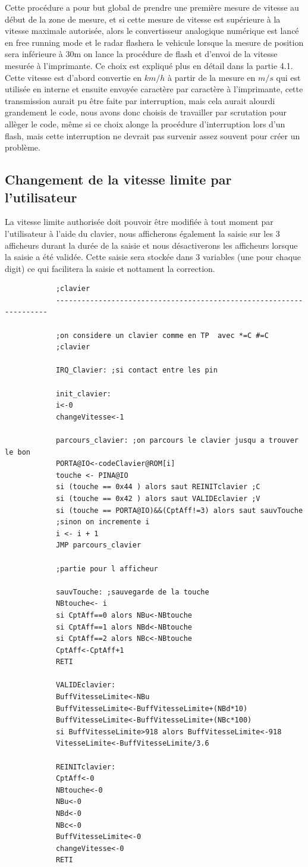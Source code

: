 \documentclass[a4paper, 12pt]{article}
\begin{document}
		Cette procédure a pour but global de prendre une première mesure de vitesse au début de la zone de mesure, et si cette mesure de vitesse est supérieure à la vitesse maximale autorisée, alors le convertisseur analogique numérique est lancé en free running mode et le radar flashera le vehicule lorsque la mesure de position sera inférieure à 30m on lance la procédure de flash et d'envoi de la vitesse mesurée à l'imprimante. Ce choix est expliqué plus en détail dans la partie 4.1.\\
		Cette vitesse est d'abord convertie en $km/h$ à partir de la mesure en $m/s$ qui est utilisée en interne et ensuite envoyée caractère par caractère à l'imprimante, cette transmission aurait pu être faite par interruption, mais cela aurait alourdi grandement le code, nous avons donc choisis de travailler par scrutation pour allèger le code, même si ce choix alonge la procédure d'interruption lors d'un flash, mais cette interruption ne devrait pas survenir assez souvent pour créer un problème.
		
		\subsection{Changement de la vitesse limite par l'utilisateur}
		La vitesse limite authorisée doit pouvoir être modifiée à tout moment par l'utilisateur à l'aide du clavier, nous afficherons également la saisie sur les 3 afficheurs durant la durée de la saisie et nous désactiverons les afficheurs lorsque la saisie a été validée. Cette saisie sera stockée dans 3 variables (une pour chaque digit) ce qui facilitera la saisie et nottament la correction.
		\begin{lstlisting}
			;clavier
			--------------------------------------------------------------------
			
			;on considere un clavier comme en TP  avec *=C #=C
			;clavier
			
			IRQ_Clavier: ;si contact entre les pin
			
			init_clavier:
			i<-0
			changeVitesse<-1
			
			parcours_clavier: ;on parcours le clavier jusqu a trouver le bon 
			PORTA@IO<-codeClavier@ROM[i]
			touche <- PINA@IO
			si (touche == 0x44 ) alors saut REINITclavier ;C
			si (touche == 0x42 ) alors saut VALIDEclavier ;V
			si (touche == PORTA@IO)&&(CptAff!=3) alors saut sauvTouche
			;sinon on incremente i
			i <- i + 1 
			JMP parcours_clavier
			
			;partie pour l afficheur 
			
			sauvTouche: ;sauvegarde de la touche 
			NBtouche<- i
			si CptAff==0 alors NBu<-NBtouche
			si CptAff==1 alors NBd<-NBtouche
			si CptAff==2 alors NBc<-NBtouche
			CptAff<-CptAff+1
			RETI
			
			VALIDEclavier:
			BuffVitesseLimite<-NBu
			BuffVitesseLimite<-BuffVitesseLimite+(NBd*10)
			BuffVitesseLimite<-BuffVitesseLimite+(NBc*100)
			si BuffVitesseLimite>918 alors BuffVitesseLimite<-918
			VitesseLimite<-BuffVitesseLimite/3.6
			
			REINITclavier:
			CptAff<-0
			NBtouche<-0 
			NBu<-0
			NBd<-0
			NBc<-0
			BuffVitesseLimite<-0
			changeVitesse<-0
			RETI
		\end{lstlisting}
		
\end{document}
